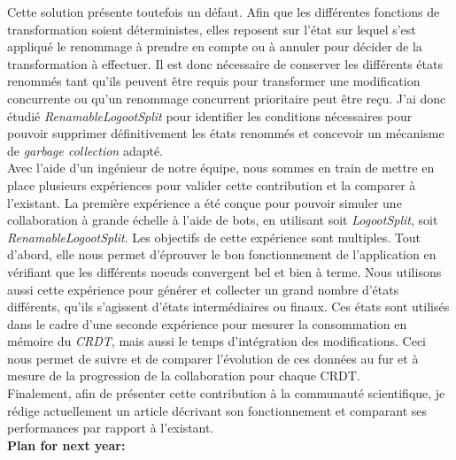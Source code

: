 \documentclass[12pt]{article}
\newcommand{\commentaire}[1]{}
\begin{document}

Cette solution présente toutefois un défaut.
Afin que les différentes fonctions de transformation soient déterministes, elles reposent sur l'état sur lequel s'est appliqué le renommage à prendre en compte ou à annuler pour décider de la transformation à effectuer.
Il est donc nécessaire de conserver les différents états renommés tant qu'ils peuvent être requis pour transformer une modification concurrente ou qu'un renommage concurrent prioritaire peut être reçu.
J'ai donc étudié \emph{RenamableLogootSplit} pour identifier les conditions nécessaires pour pouvoir supprimer définitivement les états renommés et concevoir un mécanisme de \emph{garbage collection} adapté.
\\

Avec l'aide d'un ingénieur de notre équipe, nous sommes en train de mettre en place plusieurs expériences pour valider cette contribution et la comparer à l'existant.
La première expérience a été conçue pour pouvoir simuler une collaboration à grande échelle à l'aide de bots, en utilisant soit \emph{LogootSplit}, soit \emph{RenamableLogootSplit}.
Les objectifs de cette expérience sont multiples.
Tout d'abord, elle nous permet d'éprouver le bon fonctionnement de l'application en vérifiant que les différents noeuds convergent bel et bien à terme.
Nous utilisons aussi cette expérience pour générer et collecter un grand nombre d'états différents, qu'ils s'agissent d'états intermédiaires ou finaux.
Ces états sont utilisés dans le cadre d'une seconde expérience pour mesurer la consommation en mémoire du \emph{CRDT}, mais aussi le temps d'intégration des modifications.
Ceci nous permet de suivre et de comparer l'évolution de ces données au fur et à mesure de la progression de la collaboration pour chaque \ac{CRDT}.
\\

Finalement, afin de présenter cette contribution à la communauté scientifique, je rédige actuellement un article décrivant son fonctionnement et comparant ses performances par rapport à l'existant.\\

\noindent\textbf{Plan for next year:}
\commentaire{%
  remaining problems to be considered, approach; precise planning (in
  particular for those who are at least in 3rd year, for the report
  writing and the defense)\\}
\end{document}
